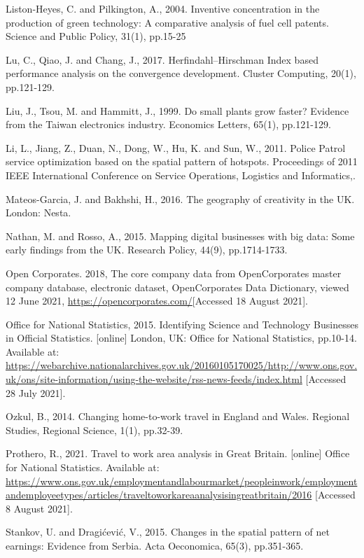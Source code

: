 \documentclass[
  12pt,
  oneside]{book}
\begin{document}
Liston-Heyes, C. and Pilkington, A., 2004. Inventive concentration in the production of green technology: A comparative analysis of fuel cell patents. Science and Public Policy, 31(1), pp.15-25

Lu, C., Qiao, J. and Chang, J., 2017. Herfindahl--Hirschman Index based performance analysis on the convergence development. Cluster Computing, 20(1), pp.121-129.

Liu, J., Tsou, M. and Hammitt, J., 1999. Do small plants grow faster? Evidence from the Taiwan electronics industry. Economics Letters, 65(1), pp.121-129.

Li, L., Jiang, Z., Duan, N., Dong, W., Hu, K. and Sun, W., 2011. Police Patrol service optimization based on the spatial pattern of hotspots. Proceedings of 2011 IEEE International Conference on Service Operations, Logistics and Informatics,.

Mateos-Garcia, J. and Bakhshi, H., 2016. The geography of creativity in the UK. London: Nesta.

Nathan, M. and Rosso, A., 2015. Mapping digital businesses with big data: Some early findings from the UK. Research Policy, 44(9), pp.1714-1733.

Open Corporates. 2018, The core company data from OpenCorporates master company database, electronic dataset, OpenCorporates Data Dictionary, viewed 12 June 2021, \url{https://opencorporates.com/}{[}Accessed 18 August 2021{]}.

Office for National Statistics, 2015. Identifying Science and Technology Businesses in Official Statistics. {[}online{]} London, UK: Office for National Statistics, pp.10-14. Available at: \url{https://webarchive.nationalarchives.gov.uk/20160105170025/http://www.ons.gov.uk/ons/site-information/using-the-website/rss-news-feeds/index.html} {[}Accessed 28 July 2021{]}.

Ozkul, B., 2014. Changing home-to-work travel in England and Wales. Regional Studies, Regional Science, 1(1), pp.32-39.

Prothero, R., 2021. Travel to work area analysis in Great Britain. {[}online{]} Office for National Statistics. Available at: \url{https://www.ons.gov.uk/employmentandlabourmarket/peopleinwork/employmentandemployeetypes/articles/traveltoworkareaanalysisingreatbritain/2016} {[}Accessed 8 August 2021{]}.

Stankov, U. and Dragićević, V., 2015. Changes in the spatial pattern of net earnings: Evidence from Serbia. Acta Oeconomica, 65(3), pp.351-365.
\end{document}
